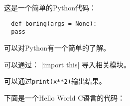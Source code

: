 \documentclass{ctexart}
\begin{document}
 
这是一个简单的Python代码：
\begin{verbatim}
  def boring(args = None):
  pass
\end{verbatim}
可以对Python有一个简单的了解。

可以通过：
|import this|
导入相关模块。

可以通过\texttt{print(x**2)}输出结果。

下面是一个Hello World C语言的代码：
\inputminted{c}{helloworld.c}
\end{document}
